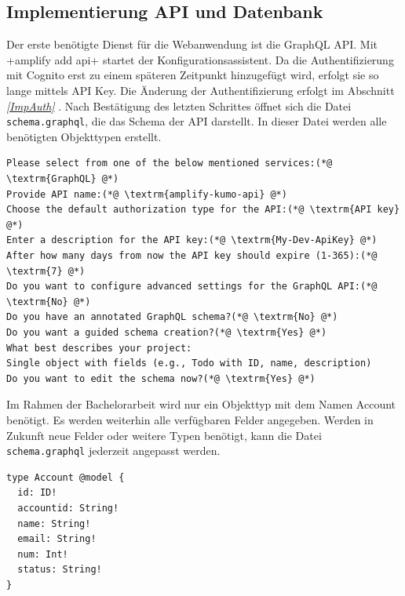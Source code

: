 \subsection{Implementierung API und Datenbank}
Der erste benötigte Dienst für die Webanwendung ist die GraphQL API.
Mit \spverb+amplify add api+ startet der Konfigurationsassistent.
Da die Authentifizierung mit Cognito erst zu einem späteren Zeitpunkt hinzugefügt wird, erfolgt sie so lange mittels API Key.
Die Änderung der Authentifizierung erfolgt im Abschnitt \textit{\ref{ImpAuth} }.
Nach Bestätigung des letzten Schrittes öffnet sich die Datei \verb+schema.graphql+, die das Schema der API darstellt.
In dieser Datei werden alle benötigten Objekttypen erstellt.
\clearpage
\begin{lstlisting}[basicstyle=\ttfamily\small, breaklines=true , frame = single, backgroundcolor=\color{flashwhite} ]
Please select from one of the below mentioned services:(*@ \textrm{GraphQL} @*)
Provide API name:(*@ \textrm{amplify-kumo-api} @*)
Choose the default authorization type for the API:(*@ \textrm{API key} @*)
Enter a description for the API key:(*@ \textrm{My-Dev-ApiKey} @*)
After how many days from now the API key should expire (1-365):(*@ \textrm{7} @*)
Do you want to configure advanced settings for the GraphQL API:(*@ \textrm{No} @*)
Do you have an annotated GraphQL schema?(*@ \textrm{No} @*)
Do you want a guided schema creation?(*@ \textrm{Yes} @*)
What best describes your project:
Single object with fields (e.g., Todo with ID, name, description)
Do you want to edit the schema now?(*@ \textrm{Yes} @*)
\end{lstlisting}

Im Rahmen der Bachelorarbeit wird nur ein Objekttyp mit dem Namen Account benötigt.
Es werden weiterhin alle verfügbaren Felder angegeben.
Werden in Zukunft neue Felder oder weitere Typen benötigt, kann die Datei \verb+schema.graphql+ jederzeit angepasst werden.
\\
\begin{lstlisting}[basicstyle=\ttfamily\small, breaklines=true , frame = single, backgroundcolor=\color{flashwhite} ]
type Account @model {
  id: ID!
  accountid: String!
  name: String!
  email: String!
  num: Int!
  status: String!
}

\end{lstlisting}

